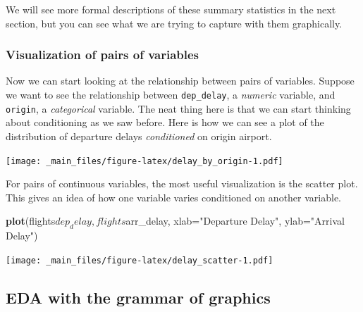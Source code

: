 \documentclass[]{article}
\newenvironment{Shaded}{\begin{snugshade}}{\end{snugshade}}
\newcommand{\KeywordTok}[1]{\textcolor[rgb]{0.13,0.29,0.53}{\textbf{{#1}}}}
\newcommand{\DataTypeTok}[1]{\textcolor[rgb]{0.13,0.29,0.53}{{#1}}}
\newcommand{\DecValTok}[1]{\textcolor[rgb]{0.00,0.00,0.81}{{#1}}}
\newcommand{\StringTok}[1]{\textcolor[rgb]{0.31,0.60,0.02}{{#1}}}
\newcommand{\OtherTok}[1]{\textcolor[rgb]{0.56,0.35,0.01}{{#1}}}
\newcommand{\NormalTok}[1]{{#1}}
\theoremstyle{definition}
\theoremstyle{definition}
\theoremstyle{remark}
\begin{document}
We will see more formal descriptions of these summary statistics in the
next section, but you can see what we are trying to capture with them
graphically.

\subsubsection{Visualization of pairs of
variables}\label{visualization-of-pairs-of-variables}

Now we can start looking at the relationship between pairs of variables.
Suppose we want to see the relationship between \texttt{dep\_delay}, a
\emph{numeric} variable, and \texttt{origin}, a \emph{categorical}
variable. The neat thing here is that we can start thinking about
conditioning as we saw before. Here is how we can see a plot of the
distribution of departure delays \emph{conditioned} on origin airport.

\begin{Shaded}
\end{Shaded}

\texttt{[image: \_main\_files/figure-latex/delay\_by\_origin-1.pdf]}

For pairs of continuous variables, the most useful visualization is the
scatter plot. This gives an idea of how one variable varies conditioned
on another variable.

\begin{Shaded}
\begin{Highlighting}[]
\KeywordTok{plot}\NormalTok{(flights$dep_delay, flights$arr_delay, }\DataTypeTok{xlab=}\StringTok{"Departure Delay"}\NormalTok{, }\DataTypeTok{ylab=}\StringTok{"Arrival Delay"}\NormalTok{)}
\end{Highlighting}
\end{Shaded}

\texttt{[image: \_main\_files/figure-latex/delay\_scatter-1.pdf]}

\subsection{EDA with the grammar of
graphics}\label{eda-with-the-grammar-of-graphics}
\end{document}
